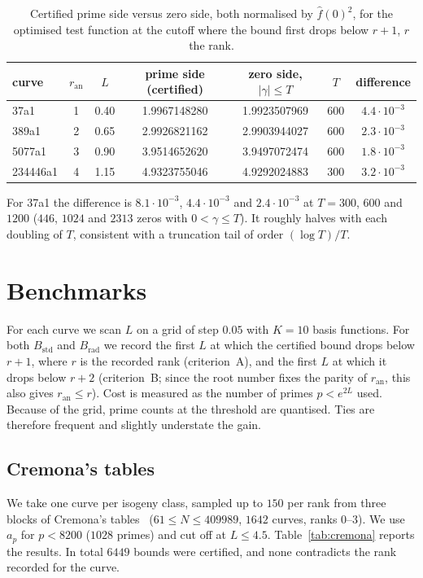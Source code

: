 \documentclass[11pt]{amsart}
\theoremstyle{remark}
\theoremstyle{definition}
\newcommand{\ran}{r_{\mathrm{an}}}
\begin{document}
\begin{table}[h]
\centering\small
\begin{tabular}{lcccccc}
\toprule
curve & $\ran$ & $L$ & prime side (certified) & zero side, $|\gamma|\le T$ & $T$ & difference\\
\midrule
37a1     & 1 & 0.40 & 1.9967148280 & 1.9923507969 & 600 & $4.4\cdot10^{-3}$\\
389a1    & 2 & 0.65 & 2.9926821162 & 2.9903944027 & 600 & $2.3\cdot10^{-3}$\\
5077a1   & 3 & 0.90 & 3.9514652620 & 3.9497072474 & 600 & $1.8\cdot10^{-3}$\\
234446a1 & 4 & 1.15 & 4.9323755046 & 4.9292024883 & 300 & $3.2\cdot10^{-3}$\\
\bottomrule
\end{tabular}
\caption{Certified prime side versus zero side, both normalised by $\hat f(0)^2$, for the optimised test function at the cutoff where the bound first drops below $r+1$, $r$ the rank.}
\label{tab:zeros}
\end{table}

For 37a1 the difference is $8.1\cdot10^{-3}$, $4.4\cdot10^{-3}$ and $2.4\cdot10^{-3}$ at $T=300$, $600$ and $1200$ ($446$, $1024$ and $2313$ zeros with $0<\gamma\le T$). It roughly halves with each doubling of $T$, consistent with a truncation tail of order $(\log T)/T$.

\section{Benchmarks}\label{sec:bench}

For each curve we scan $L$ on a grid of step $0.05$ with $K=10$ basis functions. For both $B_{\mathrm{std}}$ and $B_{\mathrm{rad}}$ we record the first $L$ at which the certified bound drops below $r+1$, where $r$ is the recorded rank (criterion~A), and the first $L$ at which it drops below $r+2$ (criterion~B; since the root number fixes the parity of $\ran$, this also gives $\ran\le r$). Cost is measured as the number of primes $p<e^{2L}$ used. Because of the grid, prime counts at the threshold are quantised. Ties are therefore frequent and slightly understate the gain.

\subsection{Cremona's tables}
We take one curve per isogeny class, sampled up to $150$ per rank from three blocks of Cremona's tables~\cite{Cremona} ($61\le N\le 409989$, $1642$ curves, ranks $0$--$3$). We use $a_p$ for $p<8200$ ($1028$ primes) and cut off at $L\le 4.5$. Table~\ref{tab:cremona} reports the results. In total $6449$ bounds were certified, and none contradicts the rank recorded for the curve.
\end{document}
